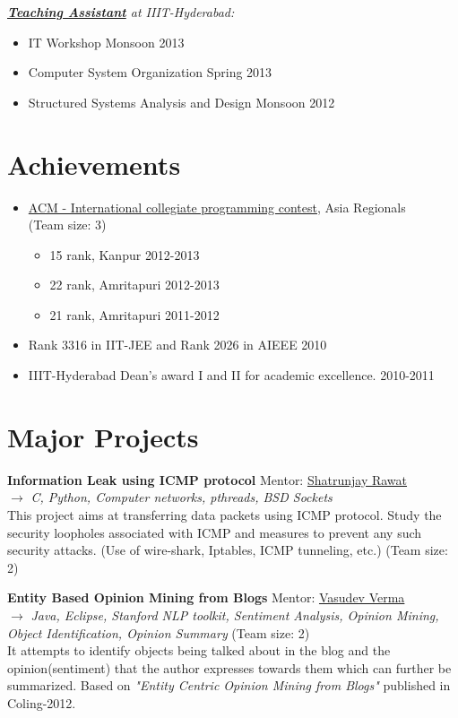\documentclass[margin]{res}
\begin{document}
\begin{resume}
{\sl \underline{\bf Teaching Assistant} at IIIT-Hyderabad: } 
\begin{itemize}
\item IT Workshop  \hfill{Monsoon 2013}
\item Computer System Organization \hfill{Spring 2013}
\item Structured Systems Analysis and Design \hfill{Monsoon 2012}
\end{itemize}



\section{Achievements}

\begin{itemize}
\item
	\hypersetup{urlcolor=black}	
	\href{http://icpc.baylor.edu/}{ACM - International collegiate programming contest}, Asia Regionals \\
	\hypersetup{urlcolor=blue}
	{(Team size: 3)}
	\begin{itemize}
		\item 15 rank, Kanpur     \hfill{2012-2013} 
		\item 22 rank, Amritapuri \hfill{2012-2013}
		\item 21 rank, Amritapuri \hfill{2011-2012} 
	\end{itemize}	 

\item Rank 3316 in IIT-JEE and Rank 2026 in AIEEE \hfill{2010}
\item IIIT-Hyderabad Dean's award I and II for academic excellence. \hfill{2010-2011} 
\end{itemize}


\section{Major Projects}
{\bf Information Leak using ICMP protocol} \hfill{Mentor: \href{http://iiit.ac.in/people/faculty/shatrunjay.rawat}{Shatrunjay Rawat}}  \\
$\rightarrow$ {\it C, Python, Computer networks, pthreads, BSD Sockets } \\
This project aims at transferring data packets using ICMP protocol. Study the security loopholes associated with ICMP and measures to prevent any such security attacks. (Use of wire-shark, Iptables, ICMP tunneling, etc.)  \hfill{(Team size: 2)}

{\bf Entity Based Opinion Mining from Blogs} \hfill{Mentor: \href{http://faculty.iiit.ac.in/~vv/Home.html}{Vasudev Verma}} \\
$\rightarrow$ {\it Java, Eclipse, Stanford NLP toolkit, Sentiment Analysis, Opinion Mining, Object Identification, Opinion Summary
} \hfill{(Team size: 2)} \\
It attempts to identify objects being
talked about in the blog and the opinion(sentiment) that the author expresses
towards them which can further be summarized. 
Based on {\it "Entity Centric Opinion Mining from Blogs"} published in Coling-2012. 


\end{resume}
\end{document}
